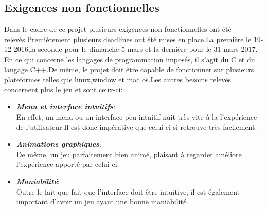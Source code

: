 \documentclass[12pt,a4paper]{article}
\begin{document}








\newpage    
\subsection{Exigences non fonctionnelles}
Dans le cadre de ce projet plusieurs exigences non fonctionnelles ont été relevés.Premièrement plusieurs deadlines ont été mises en place.La première le 19-12-2016,la seconde pour le dimanche 5 mars et la dernière pour le 31 mars 2017.
En ce qui concerne les langages de programmation imposés, il s'agit du C et du langage C++.De même, le projet doit être capable de fonctionner sur plusieurs plateformes telles que linux,window et mac os.Les autres besoins relevés concernent plus le jeu et sont ceux-ci:
\begin{itemize}
    \item \textit{\textbf{Menu et interface intuitifs}}:\\
    En effet, un menu ou un interface peu intuitif nuit très vite à la l'expérience de l'utilisateur.Il est donc impérative que celui-ci si retrouve très facilement.
    \item \textit{\textbf{Animations graphiques}}:\\
    De même, un jeu parfaitement bien animé, plaisant à regarder améliore l'expérience apporté par celui-ci.
    \item \textit{\textbf{Maniabilité}}:\\
    Outre le fait que fait que l'interface doit être intuitive, il est également important d'avoir un jeu ayant une bonne maniabilité.
    
\end{itemize}
    
\end{document}

